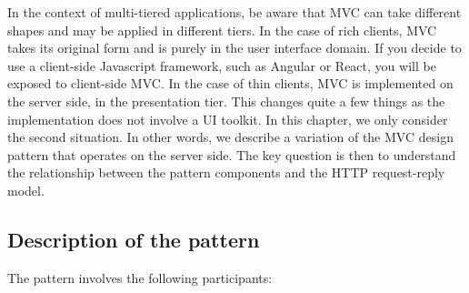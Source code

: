 In the context of multi-tiered applications, be aware that \ac{MVC} can take different shapes and may be applied in different tiers. In the case of rich clients, \ac{MVC} takes its original form and is purely in the user interface domain. If you decide to use a client-side Javascript framework, such as Angular or React, you will be exposed to client-side \ac{MVC}. In the case of thin clients, \ac{MVC} is implemented on the server side, in the presentation tier. This changes quite a few things as the implementation does not involve a UI toolkit. In this chapter, we only consider the second situation. In other words, we describe a variation of the \ac{MVC} design pattern that operates on the server side. The key question is then to understand the relationship between the pattern components and the HTTP request-reply model.

\clearpage
\subsection{Description of the pattern}

The pattern involves the following participants:


